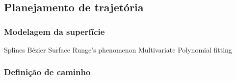 \subsection{Planejamento de trajetória}

\subsubsection{Modelagem da superfície}\label{modelagem}

Splines
Bézier Surface
Runge's phenomenon
Multivariate Polynomial fitting




\subsubsection{Definição de caminho}
